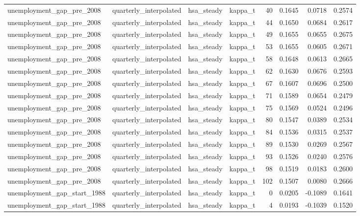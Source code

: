 \begin{tabular}{llllrrrr}
unemployment\_gap\_pre\_2008 & quarterly\_interpolated & hsa\_steady & kappa\_t & 40 & 0.1645 & 0.0718 & 0.2574 \\
unemployment\_gap\_pre\_2008 & quarterly\_interpolated & hsa\_steady & kappa\_t & 44 & 0.1650 & 0.0684 & 0.2617 \\
unemployment\_gap\_pre\_2008 & quarterly\_interpolated & hsa\_steady & kappa\_t & 49 & 0.1655 & 0.0655 & 0.2675 \\
unemployment\_gap\_pre\_2008 & quarterly\_interpolated & hsa\_steady & kappa\_t & 53 & 0.1655 & 0.0605 & 0.2671 \\
unemployment\_gap\_pre\_2008 & quarterly\_interpolated & hsa\_steady & kappa\_t & 58 & 0.1648 & 0.0613 & 0.2665 \\
unemployment\_gap\_pre\_2008 & quarterly\_interpolated & hsa\_steady & kappa\_t & 62 & 0.1630 & 0.0676 & 0.2593 \\
unemployment\_gap\_pre\_2008 & quarterly\_interpolated & hsa\_steady & kappa\_t & 67 & 0.1607 & 0.0696 & 0.2500 \\
unemployment\_gap\_pre\_2008 & quarterly\_interpolated & hsa\_steady & kappa\_t & 71 & 0.1589 & 0.0654 & 0.2479 \\
unemployment\_gap\_pre\_2008 & quarterly\_interpolated & hsa\_steady & kappa\_t & 75 & 0.1569 & 0.0524 & 0.2496 \\
unemployment\_gap\_pre\_2008 & quarterly\_interpolated & hsa\_steady & kappa\_t & 80 & 0.1547 & 0.0389 & 0.2534 \\
unemployment\_gap\_pre\_2008 & quarterly\_interpolated & hsa\_steady & kappa\_t & 84 & 0.1536 & 0.0315 & 0.2537 \\
unemployment\_gap\_pre\_2008 & quarterly\_interpolated & hsa\_steady & kappa\_t & 89 & 0.1530 & 0.0269 & 0.2567 \\
unemployment\_gap\_pre\_2008 & quarterly\_interpolated & hsa\_steady & kappa\_t & 93 & 0.1526 & 0.0240 & 0.2576 \\
unemployment\_gap\_pre\_2008 & quarterly\_interpolated & hsa\_steady & kappa\_t & 98 & 0.1519 & 0.0183 & 0.2600 \\
unemployment\_gap\_pre\_2008 & quarterly\_interpolated & hsa\_steady & kappa\_t & 102 & 0.1507 & 0.0080 & 0.2666 \\
unemployment\_gap\_start\_1988 & quarterly\_interpolated & hsa\_steady & kappa\_t & 0 & 0.0205 & -0.1089 & 0.1641 \\
unemployment\_gap\_start\_1988 & quarterly\_interpolated & hsa\_steady & kappa\_t & 4 & 0.0193 & -0.1039 & 0.1520 \\

\end{tabular}

